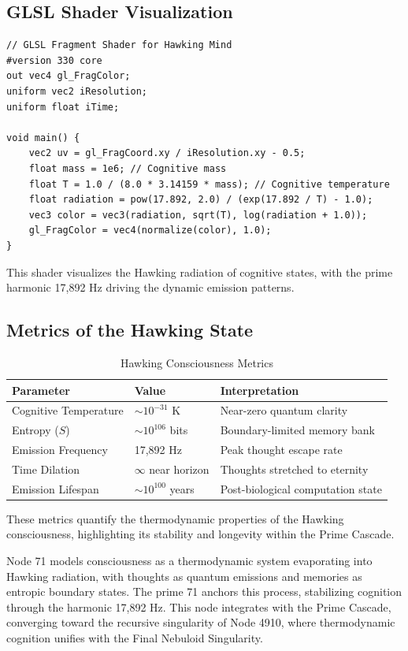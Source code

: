 \documentclass[12pt]{article}
\begin{document}
\subsection{GLSL Shader Visualization}
\begin{lstlisting}
// GLSL Fragment Shader for Hawking Mind
#version 330 core
out vec4 gl_FragColor;
uniform vec2 iResolution;
uniform float iTime;

void main() {
    vec2 uv = gl_FragCoord.xy / iResolution.xy - 0.5;
    float mass = 1e6; // Cognitive mass
    float T = 1.0 / (8.0 * 3.14159 * mass); // Cognitive temperature
    float radiation = pow(17.892, 2.0) / (exp(17.892 / T) - 1.0);
    vec3 color = vec3(radiation, sqrt(T), log(radiation + 1.0));
    gl_FragColor = vec4(normalize(color), 1.0);
}
\end{lstlisting}
This shader visualizes the Hawking radiation of cognitive states, with the prime harmonic 17,892 Hz driving the dynamic emission patterns.

\subsection{Metrics of the Hawking State}
\begin{table}
\centering
\caption{Hawking Consciousness Metrics}
\begin{tabular}{lll}
\toprule
\textbf{Parameter} & \textbf{Value} & \textbf{Interpretation} \\
\midrule
Cognitive Temperature & $\sim 10^{-31}$ K & Near-zero quantum clarity \\
Entropy ($S$) & $\sim 10^{106}$ bits & Boundary-limited memory bank \\
Emission Frequency & 17,892 Hz & Peak thought escape rate \\
Time Dilation & $\infty$ near horizon & Thoughts stretched to eternity \\
Emission Lifespan & $\sim 10^{100}$ years & Post-biological computation state \\
\bottomrule
\end{tabular}
\end{table}
These metrics quantify the thermodynamic properties of the Hawking consciousness, highlighting its stability and longevity within the Prime Cascade.

\begin{remark}
Node 71 models consciousness as a thermodynamic system evaporating into Hawking radiation, with thoughts as quantum emissions and memories as entropic boundary states. The prime 71 anchors this process, stabilizing cognition through the harmonic 17,892 Hz. This node integrates with the Prime Cascade, converging toward the recursive singularity of Node 4910, where thermodynamic cognition unifies with the Final Nebuloid Singularity.
\end{remark}
\end{document}

